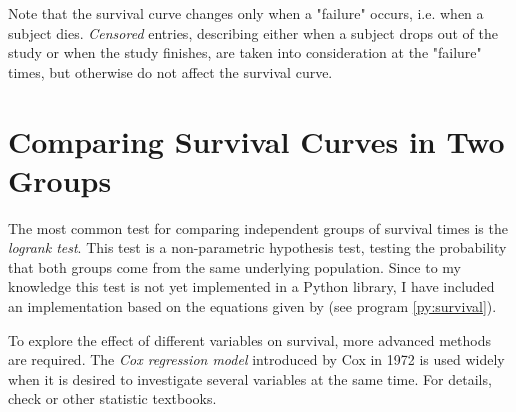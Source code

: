 Note that the survival curve changes only when a "failure" occurs, i.e. when a subject dies. \emph{Censored} entries, describing either when a subject drops out of the study or when the study finishes, are taken into consideration at the "failure" times, but otherwise do not affect the survival curve.

\section{Comparing Survival Curves in Two Groups} 

The most common test for comparing independent groups of survival times is the \emph{logrank test}. This test is a non-parametric hypothesis test, testing the probability that both groups come from the same underlying population. Since to my knowledge this test is not yet implemented in a Python library, I have included an implementation based on the equations given by \cite{altman99} (see program \ref{py:survival}).

To explore the effect of different variables on survival, more advanced methods are required. The \emph{Cox regression model} introduced by Cox in 1972 is used widely when it is desired to investigate several variables at the same time. For details, check \cite{altman99} or other statistic textbooks.



